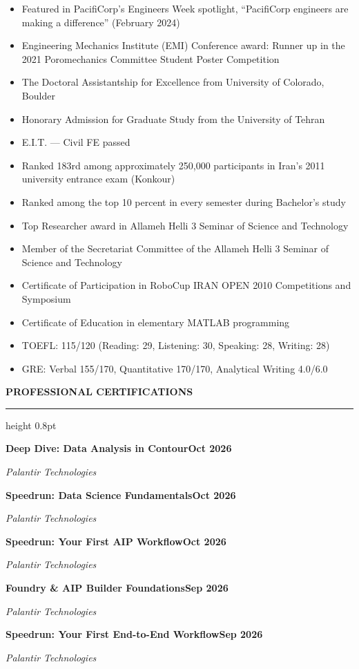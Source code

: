\documentclass[10pt, letterpaper]{article}
\newcommand{\rsection}[1]{%
  \vspace{10pt}%
  {\large\bfseries\MakeUppercase{#1}}%
  \vspace{1pt}%
  \hrule height 0.8pt%
  \vspace{5pt}%
}
\newcommand{\jobline}[2]{%
  \vspace{5pt}%
  \noindent\textbf{#1}\hfill\textbf{#2}\par%
  \vspace{1pt}%
}
\newcommand{\subline}[1]{%
  \vspace{-1pt}%
  \noindent\textit{#1}\par%
  \vspace{1pt}%
}
\newenvironment{rlist}{%
  \begin{itemize}[leftmargin=1.4em, itemsep=1pt, topsep=2pt, parsep=0pt]%
}{%
  \end{itemize}%
}
\begin{document}
\begin{rlist}
  \item Featured in PacifiCorp's Engineers Week spotlight, ``PacifiCorp engineers are making a difference'' (February 2024)
  \item Engineering Mechanics Institute (EMI) Conference award: Runner up in the 2021 Poromechanics Committee Student Poster Competition
  \item The Doctoral Assistantship for Excellence from University of Colorado, Boulder
  \item Honorary Admission for Graduate Study from the University of Tehran
  \item E.I.T. --- Civil FE passed
  \item Ranked 183rd among approximately 250,000 participants in Iran's 2011 university entrance exam (Konkour)
  \item Ranked among the top 10 percent in every semester during Bachelor's study
  \item Top Researcher award in Allameh Helli 3 Seminar of Science and Technology
  \item Member of the Secretariat Committee of the Allameh Helli 3 Seminar of Science and Technology
  \item Certificate of Participation in RoboCup IRAN OPEN 2010 Competitions and Symposium
  \item Certificate of Education in elementary MATLAB programming
  \item TOEFL: 115/120 (Reading: 29, Listening: 30, Speaking: 28, Writing: 28)
  \item GRE: Verbal 155/170, Quantitative 170/170, Analytical Writing 4.0/6.0
\end{rlist}

\rsection{Professional Certifications}

\jobline{Deep Dive: Data Analysis in Contour}{Oct 2026}
\subline{Palantir Technologies}

\jobline{Speedrun: Data Science Fundamentals}{Oct 2026}
\subline{Palantir Technologies}

\jobline{Speedrun: Your First AIP Workflow}{Oct 2026}
\subline{Palantir Technologies}

\jobline{Foundry \& AIP Builder Foundations}{Sep 2026}
\subline{Palantir Technologies}

\jobline{Speedrun: Your First End-to-End Workflow}{Sep 2026}
\subline{Palantir Technologies}
\end{document}
